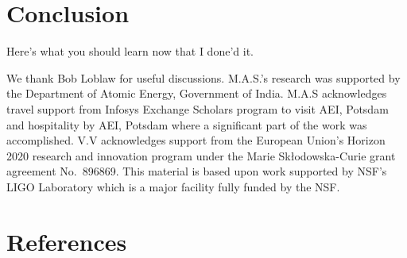 \documentclass[aps,prd,amsmath,floats,floatfix, twocolumn,
superscriptaddress,nofootinbib,showpacs]{revtex4-1}
\begin{document}
\section{Conclusion}
\label{sec:conclusion}
Here's what you should learn now that I done'd it.


\begin{acknowledgments}
We thank Bob Loblaw for useful discussions.
M.A.S.’s research was supported by the Department of Atomic Energy, Government of
India. M.A.S acknowledges travel support from Infosys Exchange Scholars program to visit
AEI, Potsdam and hospitality by AEI, Potsdam where a significant part of the work was
accomplished.
V.V acknowledges support from the European Union’s Horizon 2020 research and
innovation program under the Marie Skłodowska-Curie grant agreement No.~896869.
This material is based upon work supported by NSF's LIGO Laboratory which is a
major facility fully funded by the NSF.
\end{acknowledgments}

\section*{References}

\end{document}
